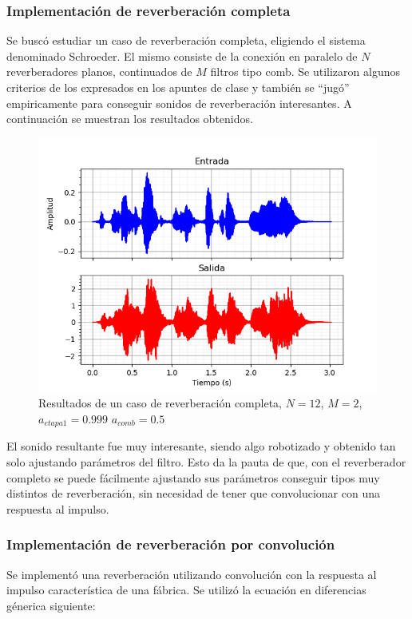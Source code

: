 \documentclass[assd_tp2_main.tex]{subfiles}
\begin{document}
\subsubsection{Implementación de reverberación completa}
Se buscó estudiar un caso de reverberación completa, eligiendo  el sistema denominado Schroeder. El mismo consiste de la conexión en paralelo de $N$ reverberadores planos, continuados de $M$ filtros tipo comb. Se utilizaron algunos criterios de los expresados en los apuntes de clase y también se ``jugó'' empiricamente para conseguir sonidos de reverberación interesantes.
\newpage
A continuación se muestran los resultados obtenidos.
\begin{figure}[H]	
	\centering
	\includegraphics[scale=1]{graficos/EJ8/eco_completo.png}
	\caption{Resultados de un caso de reverberación completa, $N=12$, $M=2$, $a_{etapa1}=0.999$ $a_{comb}=0.5$}
	\label{fig:bloqueElemental}
\end{figure}
El sonido resultante fue muy interesante, siendo algo robotizado y obtenido tan solo ajustando parámetros del filtro. Esto da la pauta de que, con el reverberador completo se puede fácilmente ajustando sus parámetros conseguir tipos muy distintos de reverberación, sin necesidad de tener que convolucionar con una respuesta al impulso.


\subsubsection{Implementación de reverberación por convolución}
Se implementó una reverberación utilizando convolución con la respuesta al impulso característica de una fábrica. Se utilizó la ecuación en diferencias génerica siguiente:
\end{document}
